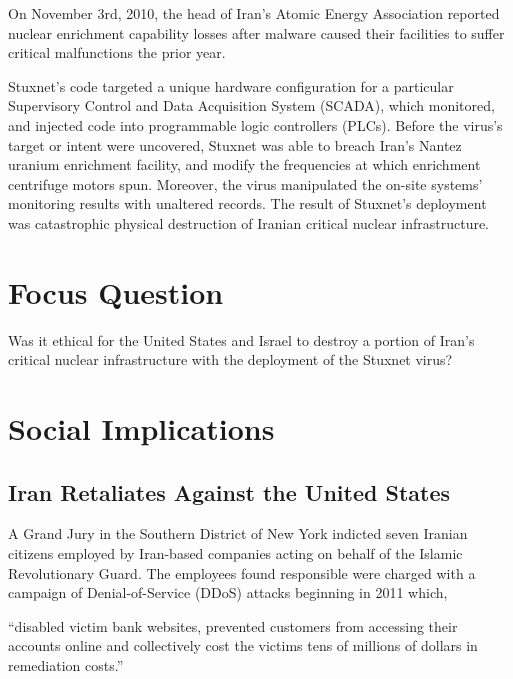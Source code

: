 \documentclass[12pt]{article}
\begin{document}
\begin{multicols}{2}
On November 3rd, 2010, the head of Iran's Atomic Energy Association reported nuclear enrichment capability losses after malware caused their facilities to suffer critical malfunctions the prior year.\cite{didStuxnetTakeOut1000Centrifuges} 

Stuxnet's code targeted a unique hardware configuration for a particular Supervisory Control and Data Acquisition System (SCADA), which monitored, and injected code into programmable logic controllers (PLCs). Before the virus's target or intent were uncovered, Stuxnet was able to breach Iran's Nantez uranium enrichment facility, and modify the frequencies at which enrichment centrifuge motors spun. Moreover, the virus manipulated the on-site systems' monitoring results with unaltered records. The result of Stuxnet's deployment was catastrophic physical destruction of Iranian critical nuclear infrastructure.\cite{w32.stuxnetDossier}\cite{lessonsFromStuxnet}

\section{Focus Question}

Was it ethical for the United States and Israel to destroy a portion of Iran's critical nuclear infrastructure with the deployment of the Stuxnet virus?

\section{Social Implications}

\subsection{Iran Retaliates Against the United States}
A Grand Jury in the Southern District of New York indicted seven Iranian citizens employed by Iran-based companies acting on behalf of the Islamic Revolutionary Guard.\cite{sevenIraniansIndicted} The employees found responsible were charged with a campaign of Denial-of-Service (DDoS) attacks beginning in 2011 which, 

\begin{displayquote}
``disabled victim bank websites, prevented customers from accessing their accounts online and collectively cost the victims tens of millions of dollars in remediation costs.''\cite{sevenIraniansIndicted}
\end{displayquote}


\end{multicols}
\end{document}
